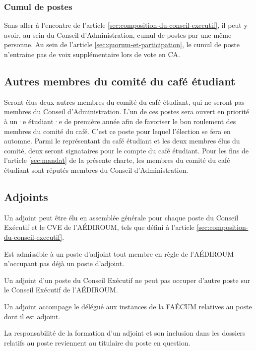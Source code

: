 \documentclass{aediroum}
\newcommand{\article}[1]{article \ref{#1}}
\begin{document}
\subsubsection{Cumul de postes}\label{sec:cumul-de-postes}

Sans aller à l'encontre de l'\article{sec:composition-du-conseil-executif}, il peut y avoir, au sein du Conseil d'Administration, cumul de postes par une même personne. Au sein de l'\article{sec:quorum-et-participation}, le cumul de poste n'entraine pas de voix supplémentaire lors de vote en CA.

\subsection{Autres membres du comité du café étudiant}\label{sec:autres-membres-du-comite-du-cafe-etudiant}

Seront élus deux autres membres du comité du café étudiant, qui ne seront pas membres du Conseil d'Administration. L'un de ces postes sera ouvert en priorité à un·e étudiant·e de première année afin de favoriser le bon roulement des membres du comité du café. C'est ce poste pour lequel l'élection se fera en automne. Parmi le représentant du café étudiant et les deux membres élus du comité, deux seront signataires pour le compte du café étudiant. Pour les fins de l'\article{sec:mandat} de la présente charte, les membres du comité du café étudiant sont réputés membres du Conseil d'Administration.

\subsection{Adjoints}\label{sec:adjoints}

Un adjoint peut être élu en assemblée générale pour chaque poste du Conseil Exécutif et le CVE de l'AÉDIROUM, tels que défini à l'\article{sec:composition-du-conseil-executif}.

Est admissible à un poste d'adjoint tout membre en règle de l'AÉDIROUM n'occupant pas déjà un poste d'adjoint.

Un adjoint d'un poste du Conseil Exécutif ne peut pas occuper d'autre poste sur le Conseil Exécutif de l'AÉDIROUM.

Un adjoint accompage le délégué aux instances de la FAÉCUM relatives au poste dont il est adjoint.

La responsabilité de la formation d'un adjoint et son inclusion dans les dossiers relatifs au poste reviennent au titulaire du poste en question.
\end{document}
